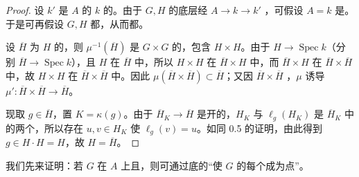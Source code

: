 \begin{proof}
设 $k'$ 是 $A$ 的 $k$ 的。由于 $G,H$ 的底层经 $A\to k\to k'$ ，可假设 $A=k$ 是。于是可再假设 $G,H$ 都，从而都。

设 $\overline H$ 为 $H$ 的，则 $\mu^{-1}(\overline H)$ 是 $G\times G$ 的，包含 $H\times H$。由于 $H\to\operatorname{Spec}k$（分别 $\overline H\to\operatorname{Spec}k$），且 $H$ 在 $\overline H$ 中，所以 $H\times H$ 在 $\overline H\times H$ 中，而 $\overline H\times H$ 在 $\overline H\times\overline H$ 中，故 $H\times H$ 在 $\overline H\times\overline H$ 中。因此 $\mu(\overline H\times\overline H)\subset\overline H$；又因 $\overline H\times\overline H$ ，$\mu$ 诱导 $\mu':\overline H\times\overline H\to\overline H$。

现取 $g\in\overline H$，置 $K=\kappa(g)$。由于 $\overline H_K\to\overline H$ 是开的，$H_K$ 与 $\ell_g(H_K)$ 是 $\overline H_K$ 中的两个，所以存在 $u,v\in H_K$ 使 $\ell_g(v)=u$。如同 0.5 的证明，由此得到 $g\in H\cdot H=H$，故 $H=\overline H$。
\end{proof}

我们先来证明：若 $G$ 在 $A$ 上且，则可通过底的“使 $G$ 的每个成为点”。

